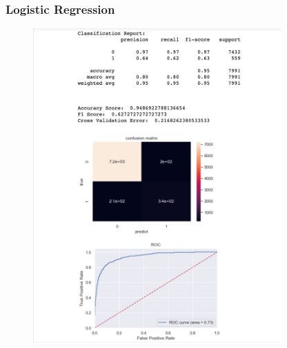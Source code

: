 \documentclass{article}
\begin{document}
\subsubsection{Logistic Regression}
\begin{figure}[H]
    \centering
    \includegraphics[width=0.85\textwidth]{Fig4}
\end{figure}
\end{document}
